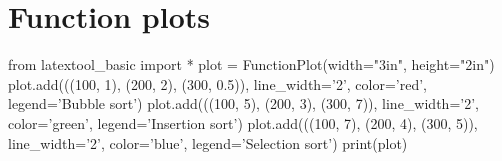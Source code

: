 \section{Function plots}
\begin{python}
from latextool_basic import *
plot = FunctionPlot(width="3in", height="2in")
plot.add(((100, 1),
(200, 2),
(300, 0.5)),
line_width='2', color='red', legend='Bubble sort')
plot.add(((100, 5),
(200, 3),
(300, 7)),
line_width='2', color='green', legend='Insertion sort')
plot.add(((100, 7),
(200, 4),
(300, 5)),
line_width='2', color='blue', legend='Selection sort')
print(plot)
\end{python}


